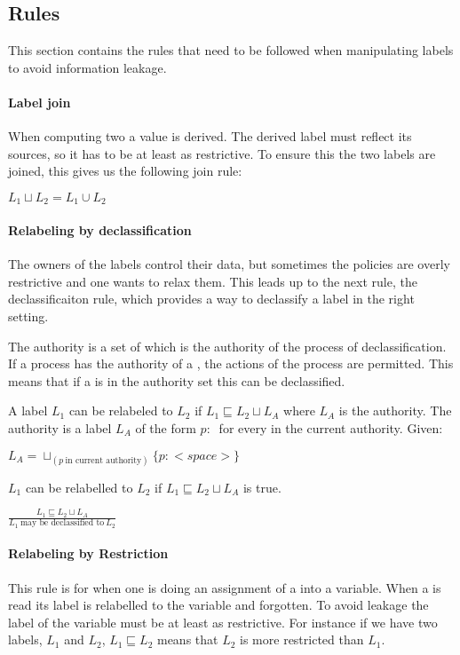 \subsection{Rules}
This section contains the rules that need to be followed when manipulating labels to avoid information leakage.

\paragraph{Label join}
When computing two \xvalues{} a value is derived.
The derived \xvalues{} label must reflect its sources, so it has to be at least as restrictive.
To ensure this the two labels are joined, this gives us the following join rule:
\begin{definition}
  $L_1 \sqcup L_2 = L_1 \cup L_2$
\end{definition}

\paragraph{Relabeling by declassification}
The owners of the labels control their data, but sometimes the policies are overly restrictive and one wants to relax them.
This leads up to the next rule, the declassificaiton rule, which provides a way to declassify a label in the right setting.

The authority is a set of \principals{} which is the authority of the process of declassification.
If a process has the authority of a \principal{}, the actions of the process are permitted.
This means that if a \principal{} is in the authority set this can be declassified.

A label $L_1$ can be relabeled to $L_2$ if $L_1 \sqsubseteq L_2 \sqcup L_A$ where $L_A$ is the authority.
The authority is a label $L_A$ of the form ${p: \ }$ for every \principal{} in the current authority.
Given:
\begin{center}
  $L_A = \sqcup_{(p \  \mbox{in current authority})}\{p: <space> \}$
\end{center}
$L_1$ can be relabelled to $L_2$ if $L_1 \sqsubseteq L_2 \sqcup L_A$ is true.
\begin{definition}
    $\frac{L_1 \sqsubseteq L_2 \sqcup L_A}{L_1 \ \mbox{may be declassified to} \ L_2}$
\end{definition}

\paragraph{Relabeling by Restriction}
This rule is for when one is doing an assignment of a \xvalue{} into a variable.
When a \xvalue{} is read its label is relabelled to the variable and forgotten.
To avoid leakage the label of the variable must be at least as restrictive.
For instance if we have two labels, $L_1$ and $L_2$, $L_1 \sqsubseteq L_2$ means that $L_2$ is more restricted than $L_1$.

